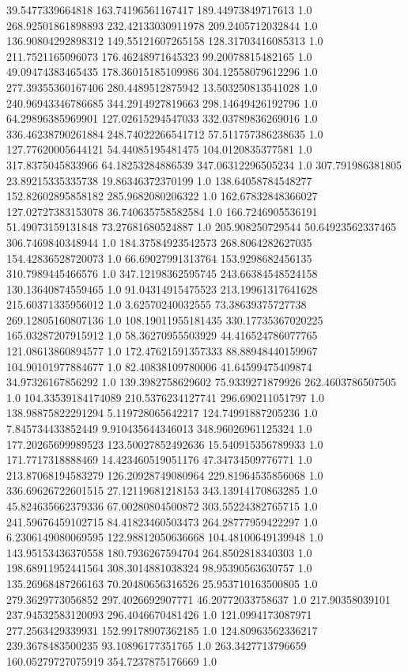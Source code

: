 39.5477339664818	163.74196561167417	189.44973849717613	1.0
268.92501861898893	232.42133030911978	209.2405712032844	1.0
136.90804292898312	149.55121607265158	128.31703416085313	1.0
211.7521165096073	176.46248971645323	99.20078815482165	1.0
49.09474383465435	178.36015185109986	304.12558079612296	1.0
277.39355360167406	280.4489512875942	13.503250813541028	1.0
240.96943346786685	344.2914927819663	298.14649426192796	1.0
64.29896385969901	127.02615294547033	332.03789836269016	1.0
336.46238790261884	248.74022266541712	57.511757386238635	1.0
127.77620005644121	54.44085195481475	104.0120835377581	1.0
317.8375045833966	64.18253284886539	347.06312296505234	1.0
307.791986381805	23.89215335335738	19.86346372370199	1.0
138.64058784548277	152.82602895858182	285.9682080206322	1.0
162.67832848366027	127.02727383153078	36.740635758582584	1.0
166.7246905536191	51.49073159131848	73.27681680524887	1.0
205.908250729544	50.64923562337465	306.7469840348944	1.0
184.37584923542573	268.8064282627035	154.42836528720073	1.0
66.69027991313764	153.9298682456135	310.7989445466576	1.0
347.12198362595745	243.66384548524158	130.13640874559465	1.0
91.04314915475523	213.19961317641628	215.60371335956012	1.0
3.62570240032555	73.38639375727738	269.12805160807136	1.0
108.19011955181435	330.17735367020225	165.03287207915912	1.0
58.36270955503929	44.416524786077765	121.08613860894577	1.0
172.47621591357333	88.88948440159967	104.90101977884677	1.0
82.40838109780006	41.64599475409874	34.97326167856292	1.0
139.3982758629602	75.9339271879926	262.4603786507505	1.0
104.33539184174089	210.5376234127741	296.690211051797	1.0
138.98875822291294	5.119728065642217	124.74991887205236	1.0
7.845734433852449	9.910435644346013	348.96026961125324	1.0
177.20265699989523	123.50027852492636	15.540915356789933	1.0
171.7717318888469	14.423460519051176	47.34734509776771	1.0
213.87068194583279	126.20928749080964	229.81964535856068	1.0
336.69626722601515	27.12119681218153	343.13914170863285	1.0
45.824635662379336	67.00280804500872	303.55224382765715	1.0
241.59676459102715	84.41823460503473	264.28777959422297	1.0
6.2306149080069595	122.98812050636668	104.48100649139948	1.0
143.95153436370558	180.7936267594704	264.8502818340303	1.0
198.68911952441564	308.3014881038324	98.95390563630757	1.0
135.26968487266163	70.20480656316526	25.953710163500805	1.0
279.3629773056852	297.4026692907771	46.20772033758637	1.0
217.90358039101	237.94532583120093	296.4046670481426	1.0
121.0994173087971	277.2563429339931	152.99178907362185	1.0
124.80963562336217	239.3678483500235	93.10896177351765	1.0
263.3427713796659	160.05279727075919	354.7237875176669	1.0
